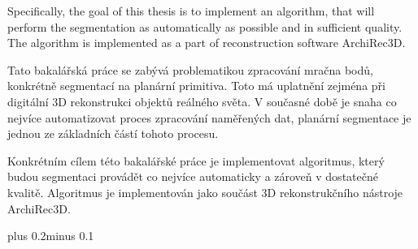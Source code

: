 \documentclass[11pt,twoside,a4paper]{book}
\begin{document}
Specifically, the goal of this thesis is to implement an algorithm, that will perform the segmentation as automatically as possible and in sufficient quality. The algorithm is implemented as a part of reconstruction software ArchiRec3D.


\baselineskip

\noindent
Tato bakalářská práce se zabývá problematikou zpracování mračna bodů, konkrétně segmentací na planární
primitiva. Toto má uplatnění zejména při digitální 3D rekonstrukci objektů reálného světa. V současné době je
snaha co nejvíce automatizovat proces zpracování naměřených dat, planární segmentace je jednou ze základních
částí tohoto procesu.

Konkrétním cílem této bakalářské práce je implementovat algoritmus, který budou segmentaci provádět co
nejvíce automaticky a zároveň v dostatečné kvalitě. Algoritmus je implementován jako součást 3D
rekonstrukčního nástroje ArchiRec3D.

\tableofcontents

\listoffigures

\listoftables

\renewcommand*{\lstlistlistingname}{Seznam zdrojových kódů}
\lstlistoflistings


\mainbodystarts
\normalfont
{}\baselineskip plus 0.2\baselineskip minus 0.1\baselineskip



% 
% 
\end{document}
